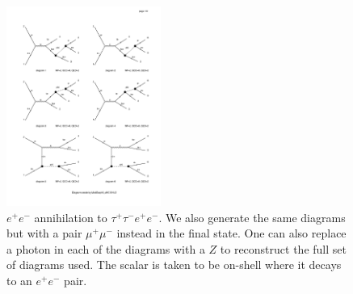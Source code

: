 \begin{figure}[h]
    \includegraphics[width=0.45\textwidth,clip=true,viewport=65 550 315 730,page=2]{Figures/madgraph_diagrams/ee_tautauee_scalar.pdf}
    \caption{$e^+ e^-$ annihilation to $\tau^+ \tau^- e^+ e^-$. We also generate the same diagrams but with a pair $\mu^+ \mu^-$ instead in the final state. One can also replace a photon in each of the diagrams with a $Z$ to reconstruct the full set of diagrams used. The scalar is taken to be on-shell where it decays to an $e^+ e^-$ pair.}
    \label{fig:ee_tautauee_scalar}
\end{figure}
